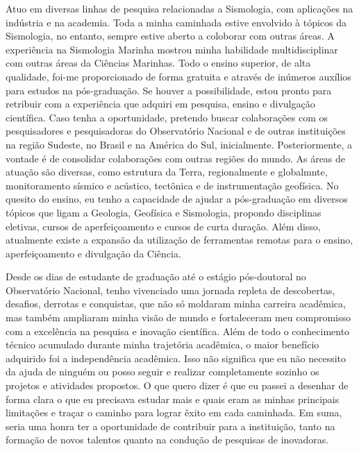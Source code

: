 \documentclass[10pt,a4paper,oneside]{book}
\begin{document}
Atuo em diversas linhas de pesquisa relacionadas a Sismologia, com aplicações na indústria e na academia. Toda a minha caminhada estive envolvido à tópicos da Sismologia, no entanto, sempre estive aberto a coloborar com outras áreas. A experiência na Sismologia Marinha mostrou minha habilidade multidisciplinar com outras áreas da Ciências Marinhas. Todo o ensino superior, de alta qualidade, foi-me proporcionado de forma gratuita e através de inúmeros auxílios para estudos na pós-graduação. Se houver a possibilidade, estou pronto para retribuir com a experiência que adquiri em pesquisa, ensino e divulgação científica. Caso tenha a oportunidade, pretendo buscar colaborações com os pesquisadores e pesquisadoras do Observatório Nacional e de outras instituições na região Sudeste, no Brasil e  na América do Sul, inicialmente. Posteriormente, a vontade é de consolidar colaborações com outras regiões do mundo. As áreas de atuação são diversas, como estrutura da Terra, regionalmente e globalmnte, monitoramento sísmico e acústico, tectônica e de instrumentação geofísica. No quesito do ensino, eu tenho a capacidade de ajudar a pós-graduação em diversos tópicos que ligam a Geologia, Geofísica e Sismologia, propondo disciplinas eletivas, cursos de aperfeiçoamento e cursos de curta duração. Além disso, atualmente existe a expansão da utilização de ferramentas remotas para o ensino, aperfeiçoamento e divulgação da Ciência. 

Desde os dias de estudante de graduação até o estágio pós-doutoral no Observatório Nacional, tenho vivenciado uma jornada repleta de descobertas, desafios, derrotas e conquistas, que não só moldaram minha carreira acadêmica, mas também ampliaram minha visão de mundo e fortaleceram meu compromisso com a excelência na pesquisa e inovação científica. Além de todo o conhecimento técnico acumulado durante minha trajetória acadêmica, o maior benefício adquirido foi a independência acadêmica. Isso não significa que eu não necessito da ajuda de ninguém ou posso seguir e realizar completamente sozinho os projetos e atividades propostos. O que quero dizer é que eu passei a desenhar de forma clara o que eu precisava estudar mais e quais eram as minhas principais limitações e traçar o caminho para lograr êxito em cada caminhada. Em suma, seria uma honra ter a oportunidade de contribuir para a instituição, tanto na formação de novos talentos quanto na condução de pesquisas de inovadoras.
\end{document}
